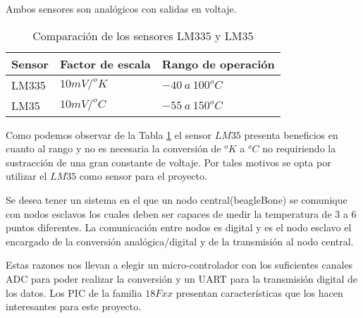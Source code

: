 Ambos sensores son analógicos con salidas en voltaje.
\begin{table}[H]
  \begin{tabular}{l l l}
    \toprule
    \textbf{Sensor} & \textbf{Factor de escala} & \textbf{Rango de operación} \\
    \toprule
    LM335 & $10mV/^o K$ & $-40~a~100 ^o C$\\
    LM35  & $10mV/^o C$ & $-55~a~150 ^o C$\\
    \bottomrule
  \end{tabular}
  \caption{Comparación de los sensores LM335 y LM35}
  \label{tab:compSens}
\end{table}

Como podemos observar de la Tabla \ref{tab:compSens} el sensor $LM35$ presenta beneficios 
en cuanto al rango y no es necesaria la conversión de $^o K$ a $^o C$ no requiriendo la
sustracción de una gran constante de voltaje. Por tales motivos se opta por utilizar el
$LM35$ como sensor para el proyecto.

Se desea tener un sistema en el que un nodo central(beagleBone) se comunique con nodos esclavos
los cuales deben ser capaces de medir la temperatura de 3 a 6 puntos diferentes. La comunicación
entre nodos es digital y es el nodo esclavo el encargado de la conversión analógica/digital
y de la transmisión al nodo central.

Estas razones nos llevan a elegir un micro-controlador con los suficientes canales ADC para
poder realizar la conversión y un UART para la transmisión digital de los datos. Los PIC de 
la familia $18Fxx$ presentan características que los hacen interesantes para este proyecto.

